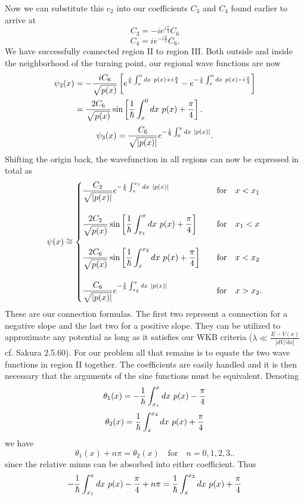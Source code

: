 \documentclass[11pt,letterpaper]{article}
\begin{document}
\begin{enumerate}
\begin{enumerate}
   Now we can substitute this $c_2$ into our coefficients $C_3$ and $C_4$ found earlier to arrive at
   $$C_3 = -ie^{i\frac{\pi}{4}}C_6$$
   $$C_4 = ie^{-i\frac{\pi}{4}}C_6.$$
   We have successfully connected region II to region III.  Both outside and inside the neighborhood of the turning point, our regional wave functions are now
 \begin{align*}\psi_{2}(x) &= -\frac{iC_6}{\sqrt{p(x)}}\left[e^{\frac{i}{\h}\int^0_x{dx\ p(x)}+i\frac{\pi}{4}}-e^{-\frac{i}{\h}\int^0_x{dx\ p(x)}-i\frac{\pi}{4}}\right]\\
 &=\frac{2C_6}{\sqrt{p(x)}}\sin\left[\frac{1}{\h}\int_x^0{dx\ p(x)}+\frac{\pi}{4}\right].\end{align*}
 $$\psi_3(x) = \frac{C_6}{\sqrt{|p(x)|}}e^{-\frac{1}{\hbar}\int_0^x{dx\ |p(x)|}}.$$
 Shifting the origin back, the wavefunction in all regions can now be expressed in total as
  $$\psi(x) \cong \begin{cases} \displaystyle\frac{C_2}{\sqrt{|p(x)|}}e^{-\frac{1}{\h}\int_x^{x_1}{dx\ |p(x)|}}&\quad\text{for}\quad x<x_1\\ \\\displaystyle
\frac{2C_2}{\sqrt{p(x)}}\sin\left[\frac{1}{\h}\int_{x_1}^x{dx\ p(x)}+\frac{\pi}{4}\right]&\quad\text{for}\quad x_1<x\\ \\\displaystyle
\frac{2C_6}{\sqrt{p(x)}}\sin\left[\frac{1}{\h}\int_x^{x_2}{dx\ p(x)}+\frac{\pi}{4}\right]&\quad\text{for}\quad x<x_2
\\ \\\displaystyle
 \frac{C_6}{\sqrt{|p(x)|}}e^{-\frac{1}{\h}\int_{x_2}^x{dx\  |p(x)|}}&\quad\text{for}\quad x>x_2.
 \end{cases}$$
 These are our connection formulas. The first two represent a connection for a negative slope and the last two for a positive slope. They can be utilized to approximate any potential as long as it satisfies our WKB criteria ($\lambda\ll\frac{E-V(x)}{|dV/dx|}$ cf. Sakura 2.5.60). For our problem all that remains is to equate the two wave functions in region II together. The coefficients are easily handled and it is then necessary that the arguments of the sine functions must be equivalent. Denoting
 $$\theta_1(x) = -\frac{1}{\h}\int_{x_1}^x{dx\ p(x)}-\frac{\pi}{4}$$
 $$\theta_2(x) = \frac{1}{\hbar}\int_{x}^{x_2}{dx\ p(x)}+\frac{\pi}{4}$$
we have
 $$\theta_1(x)+n\pi = \theta_2(x)\quad\text{for}\quad n = 0,1,2,3..$$
 since  the relative minus can be absorbed into either coefficient. Thus
$$-\frac{1}{\h}\int_{x_1}^x{dx\ p(x)}-\frac{\pi}{4}+n\pi= \frac{1}{\h}\int_{x}^{x_2}{dx\ p(x)}+\frac{\pi}{4}$$

\end{enumerate}
\end{enumerate}
\end{document}
